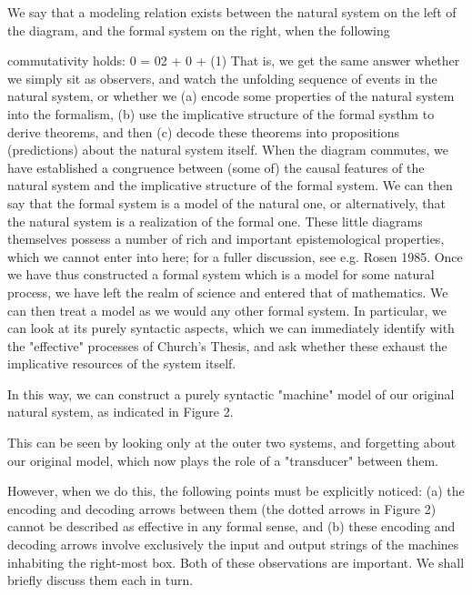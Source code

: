 \documentclass[a4paper,12pt]{article}
\begin{document}
We say that a modeling relation exists between the natural system on the left of the diagram, and the formal system on the right, when the following

commutativity holds:
0 = 02 + 0 + 	(1)
That is, we get the same answer whether we simply sit as observers, and watch the unfolding sequence of events in the natural system, or whether we (a) encode some properties of the natural system into the formalism, (b) use the implicative structure of the formal systhm to derive theorems, and then (c) decode these theorems into propositions (predictions) about the natural system itself.  When the diagram commutes, we have established a congruence between (some of) the causal features of the natural system and the implicative structure of the formal system. We can then say that the formal system is a model of the natural one, or alternatively, that the natural system is a realization of the formal one.
   These little diagrams themselves possess a number of rich and important epistemological properties, which we cannot enter into here; for a fuller discussion, see e.g. Rosen 1985.
Once we have thus constructed a formal system which is a model for
some natural process, we have left the realm of science and entered that
of mathematics. We can then treat a model as we would any other formal
system. In particular, we can look at its purely syntactic aspects, which we can immediately identify with the "effective" processes of Church's Thesis,
and ask whether these exhaust the implicative resources of the system itself.

In this way, we can construct a purely syntactic "machine" model of our original natural system, as indicated in Figure 2.

This can be seen by looking only at the outer two systems, and forgetting about our original model, which now plays the role of a "transducer"
between them.

However, when we do this, the following points must be explicitly noticed: (a) the encoding and decoding arrows between them (the
dotted arrows in Figure 2) cannot be described as effective in any formal
sense, and (b) these encoding and decoding arrows involve exclusively the
input and output strings of the machines inhabiting the right-most box. Both
of these observations are important. We shall briefly discuss them each in
turn.
\end{document}

